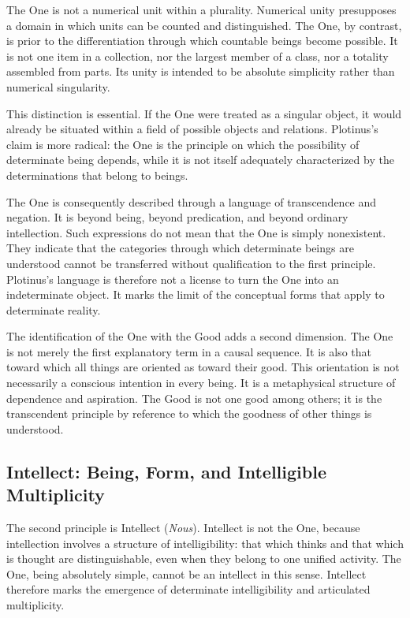 \label{para:VS.B01.P01.C08.S06.SS02.P002}
The One is not a numerical unit within a plurality. Numerical unity
presupposes a domain in which units can be counted and distinguished.
The One, by contrast, is prior to the differentiation through which
countable beings become possible. It is not one item in a collection,
nor the largest member of a class, nor a totality assembled from
parts. Its unity is intended to be absolute simplicity rather than
numerical singularity.

\label{para:VS.B01.P01.C08.S06.SS02.P003}
This distinction is essential. If the One were treated as a singular
object, it would already be situated within a field of possible
objects and relations. Plotinus's claim is more radical: the One is
the principle on which the possibility of determinate being depends,
while it is not itself adequately characterized by the determinations
that belong to beings.

\label{para:VS.B01.P01.C08.S06.SS02.P004}
The One is consequently described through a language of transcendence
and negation. It is beyond being, beyond predication, and beyond
ordinary intellection. Such expressions do not mean that the One is
simply nonexistent. They indicate that the categories through which
determinate beings are understood cannot be transferred without
qualification to the first principle. Plotinus's language is therefore
not a license to turn the One into an indeterminate object. It marks
the limit of the conceptual forms that apply to determinate reality.

\label{para:VS.B01.P01.C08.S06.SS02.P005}
The identification of the One with the Good adds a second dimension.
The One is not merely the first explanatory term in a causal sequence.
It is also that toward which all things are oriented as toward their
good. This orientation is not necessarily a conscious intention in
every being. It is a metaphysical structure of dependence and
aspiration. The Good is not one good among others; it is the
transcendent principle by reference to which the goodness of other
things is understood.

\subsection{Intellect: Being, Form, and Intelligible Multiplicity}
\label{subsec:ch08-plotinus-intellect}

\label{para:VS.B01.P01.C08.S06.SS03.P001}
The second principle is Intellect (\textit{Nous}). Intellect is not
the One, because intellection involves a structure of intelligibility:
that which thinks and that which is thought are distinguishable, even
when they belong to one unified activity. The One, being absolutely
simple, cannot be an intellect in this sense. Intellect therefore
marks the emergence of determinate intelligibility and articulated
multiplicity.

